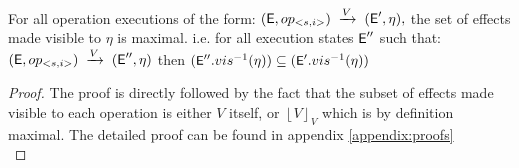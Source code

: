 %
%
\begin{theorem}
\label{theorem:two}
For all operation executions of the form: 
$({\normalfont \textsf{E}},op_{<s,i>}) 
    \;\xrightarrow{V}\;
  ({\normalfont \textsf{E}}',\eta) 
,$
the set of effects made visible to $\eta$ is maximal. i.e. for all
execution states ${\normalfont \textsf{E}}''$ such that:
$({\normalfont \textsf{E}},op_{<s,i>})\;\xrightarrow{V}\;({\normalfont \textsf{E}}'',\eta)$
then    
$\small ({\normalfont \textsf{E}}''.vis^{-1}(\eta)) \subseteq
({\normalfont \textsf{E}}'.vis^{-1}(\eta))$
\end{theorem}
\begin{proof}
The proof is directly followed by the fact that the subset of effects
made visible to each operation is either $V$ itself, or $\left \lfloor V
\right \rfloor_V$ which is by definition maximal. The detailed proof can be found in appendix
\ref{appendix:proofs} \\
\end{proof}



